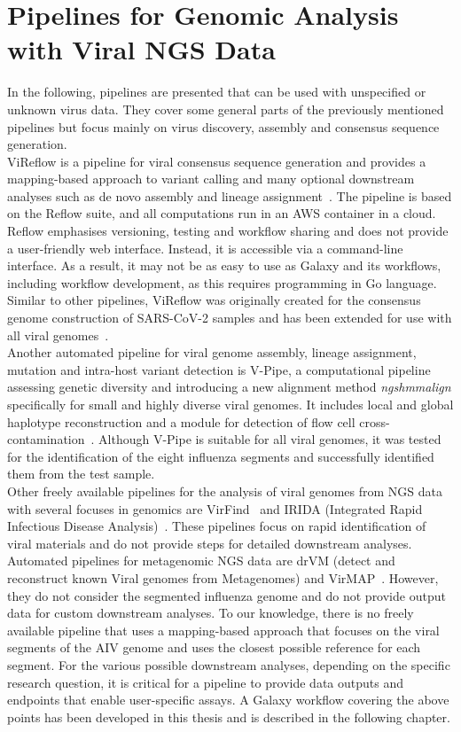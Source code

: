 \section{Pipelines for Genomic Analysis with Viral NGS Data}
In the following, pipelines are presented that can be used with unspecified or unknown virus data. They cover some general parts of the previously mentioned pipelines but focus mainly on virus discovery, assembly and consensus sequence generation. \\
ViReflow is a pipeline for viral consensus sequence generation and provides a mapping-based approach to variant calling and many optional downstream analyses such as de novo assembly and lineage assignment~\cite{moshiri2022vireflow}. The pipeline is based on the Reflow suite, and all computations run in an AWS container in a cloud. Reflow emphasises versioning, testing and workflow sharing and does not provide a user-friendly web interface. Instead, it is accessible via a command-line interface. As a result, it may not be as easy to use as Galaxy and its workflows, including workflow development, as this requires programming in Go language. Similar to other pipelines, ViReflow was originally created for the consensus genome construction of SARS-CoV-2 samples and has been extended for use with all viral genomes~\cite{moshiri2022vireflow}. \\
Another automated pipeline for viral genome assembly, lineage assignment, mutation and intra-host variant detection is V-Pipe, a computational pipeline assessing genetic diversity and introducing a new alignment method \textit{ngshmmalign} specifically for small and highly diverse viral genomes. It includes local and global haplotype reconstruction and a module for detection of flow cell cross-contamination~\cite{posada2021v}. Although V-Pipe is suitable for all viral genomes, it was tested for the identification of the eight influenza segments and successfully identified them from the test sample. \\
Other freely available pipelines for the analysis of viral genomes from NGS data with several focuses in genomics are VirFind~\cite{ho2014development} and IRIDA (Integrated Rapid Infectious Disease Analysis)~\cite{matthews2018integrated}. These pipelines focus on rapid identification of viral materials and do not provide steps for detailed downstream analyses. Automated pipelines for metagenomic NGS data are drVM (detect and reconstruct known Viral genomes from Metagenomes) and VirMAP~\cite{lin2017drvm, ajami2018maximal}. However, they do not consider the segmented influenza genome and do not provide output data for custom downstream analyses. To our knowledge, there is no freely available pipeline that uses a mapping-based approach that focuses on the viral segments of the AIV genome and uses the closest possible reference for each segment. For the various possible downstream analyses, depending on the specific research question, it is critical for a pipeline to provide data outputs and endpoints that enable user-specific assays. A Galaxy workflow covering the above points has been developed in this thesis and is described in the following chapter.
